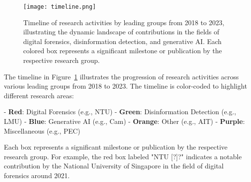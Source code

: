 \begin{figure}[h]
    \centering
    \texttt{[image: timeline.png]}
    \caption{Timeline of research activities by leading groups from 2018 to 2023, illustrating the dynamic landscape of contributions in the fields of digital forensics, disinformation detection, and generative AI. Each colored box represents a significant milestone or publication by the respective research group.}
    \label{fig:timeline}
\end{figure}

The timeline in Figure~\ref{fig:timeline} illustrates the progression of research activities across various leading groups from 2018 to 2023. The timeline is color-coded to highlight different research areas:

- \textbf{Red}: Digital Forensics (e.g., NTU)
- \textbf{Green}: Disinformation Detection (e.g., LMU)
- \textbf{Blue}: Generative AI (e.g., Cam)
- \textbf{Orange}: Other (e.g., AIT)
- \textbf{Purple}: Miscellaneous (e.g., PEC)

Each box represents a significant milestone or publication by the respective research group. For example, the red box labeled "NTU [?]?" indicates a notable contribution by the National University of Singapore in the field of digital forensics around 2021.